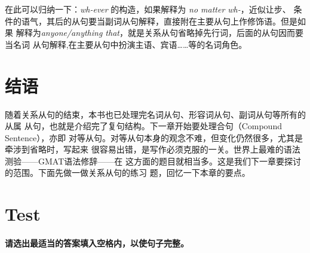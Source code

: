 在此可以归纳一下：\emph{wh-ever} 的构造，如果解释为 \emph{no matter wh-}，近似让步、
条件的语气，其后的从句要当副词从句解释，直接附在主要从句上作修饰语。但是如果
解释为\emph{anyone/anything that}，就是关系从句省略掉先行词，后面的从句因而要当名词
从句解释,在主要从句中扮演主语、宾语……等的名词角色。

\section{结语}

随着关系从句的结束，本书也已处理完名词从句、形容词从句、副词从句等所有的从属
从句，也就是介绍完了复句结构。下一章开始要处理合句（Compound Sentence），亦即
对等从句。对等从句本身的观念不难，但变化仍然很多，尤其是牵涉到省略时，写起来
很容易出错，是写作必须克服的一关。世界上最难的语法测验——GMAT语法修辞——在
这方面的题目就相当多。这是我们下一章要探讨的范围。下面先做一做关系从句的练习
题，回忆一下本章的要点。

\section{Test}

\paragraph{请选出最适当的答案填入空格内，以使句子完整。}

